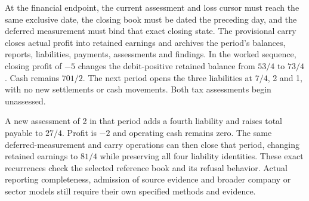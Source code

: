 At the financial endpoint, the current assessment and loss cursor must reach
the same exclusive date, the closing book must be dated the preceding day,
and the deferred measurement must bind that exact closing state. The
provisional carry closes actual profit into retained earnings and archives the
period's balances, reports, liabilities, payments, assessments and findings.
In the worked sequence, closing profit of $-5$ changes the debit-positive
retained balance from $53/4$ to $73/4$. Cash remains $701/2$. The next period
opens the three liabilities at $7/4$, 2 and 1, with no new settlements or cash
movements. Both tax assessments begin unassessed.

A new assessment of 2 in that period adds a fourth liability and raises total
payable to $27/4$. Profit is $-2$ and operating cash remains zero. The same
deferred-measurement and carry operations can then close that period, changing
retained earnings to $81/4$ while preserving all four liability identities.
These exact recurrences check the selected reference book and its refusal
behavior. Actual reporting completeness, admission of source evidence and
broader company or sector models still require their own specified methods
and evidence.
